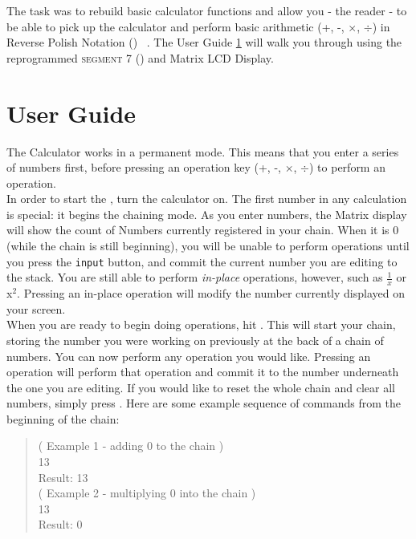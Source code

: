 \documentclass{LibHP20b}
\begin{document}
The task was to rebuild basic calculator functions and allow you - the reader - to be able to pick up the calculator and perform basic arithmetic (+, -, $\times$, $\div$) in Reverse Polish Notation (\RPN{}) ~\cite{rpninfo}. The User Guide \ref{sec:tutorial} will walk you through using the reprogrammed \textsc{segment 7} (\Sev) and Matrix LCD Display. 

\section{User Guide}
\label{sec:tutorial}
The \HP[hp] Calculator works in a permanent \RPN mode. This means that you enter a series of numbers first, before pressing an operation key (+, -, $\times$, $\div$) to perform an operation.\\
In order to start the \HP[], turn the calculator on. The first number in any \RPN{} calculation is special: it begins the \RPN{} chaining mode. As you enter numbers, the \LCD{} Matrix display will show the count of Numbers currently registered in your \RPN{} chain. When it is 0 (while the \RPN{} chain is still beginning), you will be unable to perform operations until you press the \texttt{input} button, and commit the current number you are editing to the stack. You are still able to perform \emph{in-place} operations, however, such as \texttt{$\frac{1}{x}$} or x$^{2}$. Pressing an in-place operation will modify the number currently displayed on your screen.\\
When you are ready to begin doing operations, hit . This will start your \RPN{} chain, storing the number you were working on previously at the back of a chain of numbers. You can now perform any operation you would like. Pressing an operation will perform that operation and commit it to the number underneath the one you are editing. If you would like to reset the whole chain and clear all numbers, simply press . Here are some example sequence of commands from the beginning of the \RPN{} chain:\\
\begin{quote}
\center
( Example 1 - adding 0 to the chain )\\
13  \HPButton{+}\\
Result: 13\\
( Example 2 - multiplying 0 into the chain )\\
13  \HPButton{$\times$}\\
Result: 0
\end{quote}
\end{document}
